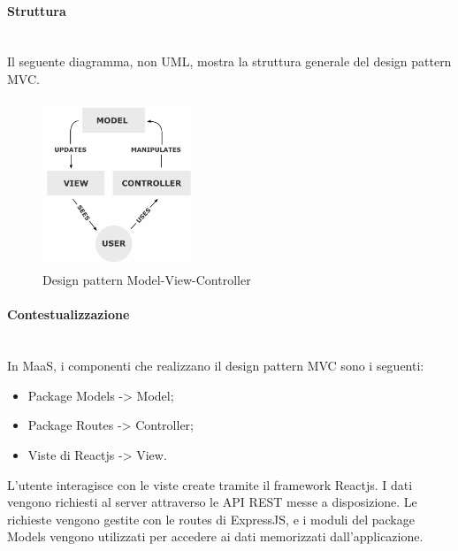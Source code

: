 \paragraph{Struttura} \mbox{} \\
Il seguente diagramma, non UML, mostra la struttura generale del design pattern MVC.
\begin{figure}[H]
\centering
\includegraphics[height=5cm]{res/sections/backend/mvc.png}
\caption{Design pattern Model-View-Controller}
\end{figure}
\paragraph{Contestualizzazione} \mbox{} \\
In MaaS, i componenti che realizzano il design pattern MVC sono i seguenti:
\begin{itemize}
\item Package Models -> Model;
\item Package Routes -> Controller;
\item Viste di Reactjs -> View.
\end{itemize}
L'utente interagisce con le viste create tramite il framework Reactjs. I dati vengono richiesti al server attraverso le API REST messe a disposizione. Le richieste vengono gestite con le routes di ExpressJS, e i moduli del package Models vengono utilizzati per accedere ai dati memorizzati dall'applicazione.
